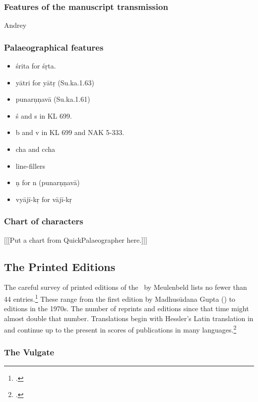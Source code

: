 \subsubsection{Features of the manuscript transmission}
Andrey
\subsubsection{Palaeographical features}
\begin{itemize}
    \item śrita for śṛta.
    \item yātri for yātṛ (Su.ka.1.63) %
     \item punarṇṇavā  (Su.ka.1.61) %
    \item ś and s in KL 699.
    \item b and v in KL 699 and NAK 5-333.
    \item cha and ccha
    \item line-fillers
    \item \d n for n (punar\d n\d nav\=a)
    \item vyājī-kṛ for vājī-kṛ
\end{itemize}

\subsubsection{Chart of characters}

[[[Put a chart from QuickPalaeographer here.]]]

\subsection{The Printed Editions}

The careful survey of printed editions of the \SS\ by Meulenbeld lists no fewer than 
44 entries.\footcite[IIB, 311--314]{meul-hist}  These range from the first edition 
by 
Madhusūdana Gupta (\citeyear{gupt-1835}) to editions in the 1970s. The 
number of 
reprints and editions since that time might almost double that number.  
Translations begin with Hessler's Latin translation in \citeyear{hess-1855} and 
continue up to the present in scores of publications in many 
languages.\footcites[E.g.,]{zysk-1984}[IIB, 314--315]{meul-hist}

\subsubsection{The Vulgate}


